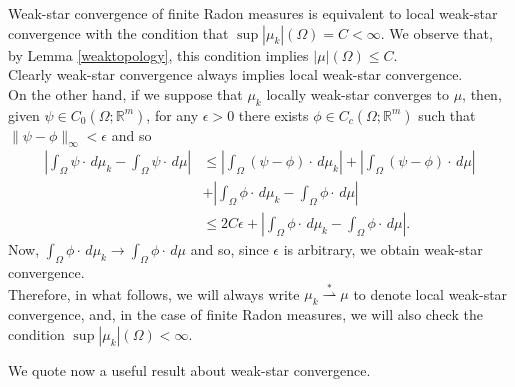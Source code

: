 \begin{remark} \label{equivalenceweak-star} Weak-star convergence of finite Radon measures is equivalent to local weak-star convergence with the condition that $\sup |\mu_{k}|(\Omega) = C < \infty$. We observe that, by Lemma \ref{weaktopology}, this condition implies $|\mu|(\Omega) \le C$. 
\\
Clearly weak-star convergence always implies local weak-star convergence. 
\\
On the other hand, if we suppose that $\mu_{k}$ locally weak-star converges to $\mu$, then, given $\psi \in C_{0}(\Omega; \mathbb{R}^{m})$, for any $\epsilon > 0$ there exists $\phi \in C_{c}(\Omega; \mathbb{R}^{m})$ such that $\|\psi - \phi\|_{\infty} < \epsilon$ and so
\begin{align*} \left | \int_{\Omega} \psi \cdot \, d\mu_{k} - \int_{\Omega} \psi \cdot \, d\mu \right | & \le \left | \int_{\Omega} (\psi - \phi) \cdot \, d\mu_{k} \right | + \left | \int_{\Omega} (\psi - \phi) \cdot \, d\mu \right | \\
& + \left | \int_{\Omega} \phi \cdot \, d\mu_{k} - \int_{\Omega} \phi \cdot \, d\mu \right | \\
& \le 2 C \epsilon + \left | \int_{\Omega} \phi \cdot \, d\mu_{k} - \int_{\Omega} \phi \cdot \, d\mu \right |.
\end{align*}
Now, $\int_{\Omega} \phi \cdot \, d\mu_{k} \to \int_{\Omega} \phi \cdot \, d\mu$ and so, since $\epsilon$ is arbitrary, we obtain weak-star convergence.
\\
Therefore, in what follows, we will always write $\mu_{k} \stackrel {*}{\rightharpoonup} \mu$ to denote local weak-star convergence, and, in the case of finite Radon measures, we will also check the condition $\sup |\mu_{k}|(\Omega) < \infty$.
\end{remark}

We quote now a useful result about weak-star convergence.


